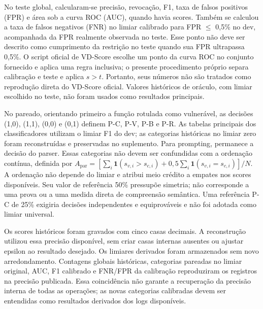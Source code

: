 \documentclass[12pt,a4paper]{article}
\begin{document}
No teste global, calcularam-se precisão, revocação, F1, taxa de falsos positivos (FPR) e área sob a curva ROC (AUC), quando havia scores. Também se calculou a taxa de falsos negativos (FNR) no limiar calibrado para FPR \(\leq\) 0,5\% no dev, acompanhada da FPR realmente observada no teste. Esse ponto não deve ser descrito como cumprimento da restrição no teste quando sua FPR ultrapassa 0,5\%. O script oficial de VD-Score escolhe um ponto da curva ROC no conjunto fornecido e aplica uma regra inclusiva; o presente procedimento próprio separa calibração e teste e aplica \(s>t\). Portanto, seus números não são tratados como reprodução direta do VD-Score oficial. Valores históricos de oráculo, com limiar escolhido no teste, não foram usados como resultados principais.

No pareado, orientando primeiro a função rotulada como vulnerável, as decisões (1,0), (1,1), (0,0) e (0,1) definem P-C, P-V, P-B e P-R. As tabelas principais dos classificadores utilizam o limiar F1 do dev; as categorias históricas no limiar zero foram reconstruídas e preservadas no suplemento. Para prompting, permanece a decisão do parser. Essas categorias não devem ser confundidas com a ordenação contínua, definida por \(A_{\mathrm{par}}=[\sum_i \mathbf{1}(s_{v,i}>s_{c,i})+0{,}5\sum_i \mathbf{1}(s_{v,i}=s_{c,i})]/N\). A ordenação não depende do limiar e atribui meio crédito a empates nos scores disponíveis. Seu valor de referência 50\% pressupõe simetria; não corresponde a uma prova ou a uma medida direta de compreensão semântica. Uma referência P-C de 25\% exigiria decisões independentes e equiprováveis e não foi adotada como limiar universal.

Os scores históricos foram gravados com cinco casas decimais. A reconstrução utilizou essa precisão disponível, sem criar casas internas ausentes ou ajustar epsilon ao resultado desejado. Os limiares derivados foram armazenados sem novo arredondamento. Contagens globais históricas, categorias pareadas no limiar original, AUC, F1 calibrado e FNR/FPR da calibração reproduziram os registros na precisão publicada. Essa coincidência não garante a recuperação da precisão interna de todas as operações; as novas categorias calibradas devem ser entendidas como resultados derivados dos logs disponíveis.
\end{document}
